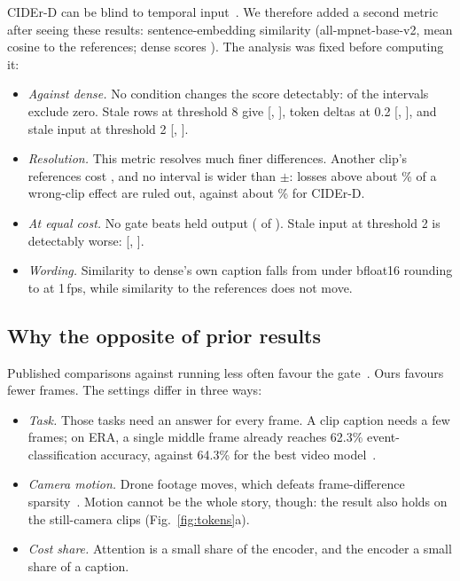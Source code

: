 \documentclass[conference]{IEEEtran}
\begin{document}
CIDEr-D can be blind to temporal input~\cite{cai2024temporalbench}. We therefore added a second metric after
seeing these results: sentence-embedding similarity (all-mpnet-base-v2, mean cosine to the references; dense
scores \EmbDense). The analysis was fixed before computing it:
\begin{itemize}
\item \textit{Against dense.} No condition changes the score detectably: \EmbExcludeZero{} of the
\CapUnadjusted{} intervals exclude zero. Stale rows at threshold 8 give \EmbBeightDelta{} [\EmbBeightLo, \EmbBeightHi], token deltas at 0.2 \EmbCtwoDelta{} [\EmbCtwoLo,
\EmbCtwoHi], and stale input at threshold 2 \EmbAtwoDelta{} [\EmbAtwoLo, \EmbAtwoHi].
\item \textit{Resolution.} This metric resolves much finer differences. Another clip's references cost
\EmbShuffledDelta, and no interval is wider than $\pm$\EmbHalfWidth: losses above about \EmbResolutionPct\% of a
wrong-clip effect are ruled out, against about \CapResolutionPct\% for CIDEr-D.
\item \textit{At equal cost.} No gate beats held output (\EmbEqBetter{} of \CapGateConds). Stale input at
threshold 2 is detectably worse: \EmbEqAtwoDelta{} [\EmbEqAtwoLo, \EmbEqAtwoHi].
\item \textit{Wording.} Similarity to dense's own caption falls from \EmbBfloatCos{} under bfloat16 rounding to
\EmbHoldoneCos{} at 1\,fps, while similarity to the references does not move.
\end{itemize}


\subsection{Why the opposite of prior results}
Published comparisons against running less often favour the
gate~\cite{dutson2022evnets,habibian2021skip,soldan2025residualvit,li2020reducto}. Ours favours fewer frames. The
settings differ in three ways:
\begin{itemize}
\item \textit{Task.} Those tasks need an answer for every frame. A clip caption needs a few frames; on ERA, a
single middle frame already reaches 62.3\% event-classification accuracy, against 64.3\% for the best video
model~\cite{mou2020era}.
\item \textit{Camera motion.} Drone footage moves, which defeats frame-difference
sparsity~\cite{parger2022deltacnn,choudhury2024rlt}. Motion cannot be the whole story, though: the result also
holds on the still-camera clips (Fig.~\ref{fig:tokens}a).
\item \textit{Cost share.} Attention is a small share of the encoder, and the encoder a small share of a
caption.
\end{itemize}
\end{document}

